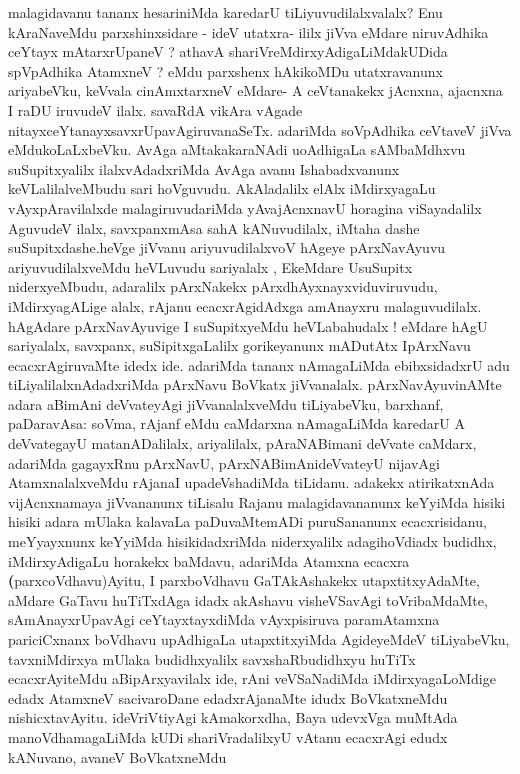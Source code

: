 \begin{artha}
malagidavanu tananx hesariniMda karedarU tiLiyuvudilalxvalalx? Enu
kAraNaveMdu parxshinxsidare - ideV utatxra- ililx jiVva eMdare
niruvAdhika ceYtayx mAtarxrUpaneV ? athavA
shariVreMdirxyAdigaLiMdakUDida spVpAdhika AtamxneV ? eMdu parxshenx
hAkikoMDu utatxravanunx ariyabeVku, keVvala cinAmxtarxneV eMdare- A
ceVtanakekx jAcnxna, ajacnxna I raDU iruvudeV ilalx. savaRdA vikAra
vAgade nitayxceYtanayxsavxrUpavAgiruvanaSeTx. adariMda soVpAdhika
ceVtaveV jiVva eMdukoLaLxbeVku. AvAga aMtakakaraNAdi uoAdhigaLa
sAMbaMdhxvu suSupitxyalilx ilalxvAdadxriMda AvAga avanu Ishabadxvanunx
keVLalilalveMbudu sari hoVguvudu. AkAladalilx elAlx iMdirxyagaLu
vAyxpAravilalxde malagiruvudariMda yAvajAcnxnavU horagina viSayadalilx
AguvudeV ilalx, savxpanxmAsa sahA kANuvudilalx, iMtaha dashe
suSupitxdashe.heVge jiVvanu ariyuvudilalxvoV hAgeye pArxNavAyuvu
ariyuvudilalxveMdu heVLuvudu sariyalalx , EkeMdare UsuSupitx
niderxyeMbudu, adaralilx pArxNakekx pArxdhAyxnayxviduviruvudu,
iMdirxyagALige alalx, rAjanu ecacxrAgidAdxga amAnayxru
malaguvudilalx. hAgAdare pArxNavAyuvige I suSupitxyeMdu heVLabahudalx
! eMdare hAgU  sariyalalx, savxpanx, suSipitxgaLalilx gorikeyanunx
mADutAtx IpArxNavu ecacxrAgiruvaMte idedx ide. adariMda tananx
nAmagaLiMda ebibxsidadxrU adu tiLiyalilalxnAdadxriMda pArxNavu BoVkatx
jiVvanalalx. pArxNavAyuvinAMte adara aBimAni deVvateyAgi
jiVvanalalxveMdu tiLiyabeVku, barxhanf, paDaravAsa: soVma, rAjanf eMdu
caMdarxna nAmagaLiMda karedarU A deVvategayU matanADalilalx,
ariyalilalx, pAraNABimani deVvate caMdarx, adariMda gagayxRnu
pArxNavU, pArxNABimAnideVvateyU nijavAgi AtamxnalalxveMdu rAjanaI
upadeVshadiMda tiLidanu. adakekx atirikatxnAda vijAcnxnamaya
jiVvananunx tiLisalu Rajanu malagidavananunx keYyiMda hisiki hisiki
adara mUlaka kalavaLa paDuvaMtemADi puruSananunx ecacxrisidanu,
meYyayxnunx keYyiMda hisikidadxriMda niderxyalilx adagihoVdiadx
budidhx, iMdirxyAdigaLu horakekx baMdavu, adariMda Atamxna ecacxra
\textbf(parxcoVdhavu)Ayitu, I parxboVdhavu GaTAkAshakekx
utapxtitxyAdaMte, aMdare GaTavu huTiTxdAga idadx akAshavu visheVSavAgi
toVribaMdaMte, sAmAnayxrUpavAgi ceYtayxtayxdiMda vAyxpisiruva
paramAtamxna pariciCxnanx boVdhavu upAdhigaLa utapxtitxyiMda
AgideyeMdeV tiLiyabeVku, tavxniMdirxya mUlaka budidhxyalilx
savxshaRbudidhxyu huTiTx ecacxrAyiteMdu aBipArxyavilalx ide, rAni
veVSaNadiMda iMdirxyagaLoMdige edadx AtamxneV sacivaroDane
edadxrAjanaMte idudx BoVkatxneMdu nishicxtavAyitu. ideVriVtiyAgi
kAmakorxdha, Baya udevxVga muMtAda manoVdhamagaLiMda kUDi
shariVradalilxyU  vAtanu ecacxrAgi edudx kANuvano, avaneV BoVkatxneMdu

\end{artha}
